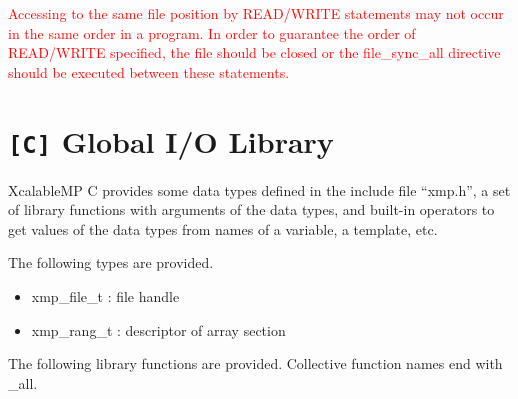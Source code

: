    \textcolor{red}{
   Accessing to the same file position by READ/WRITE statements may not
   occur in the same order in a program. In order to guarantee the order
   of READ/WRITE specified, the file should be closed or the
   file\_sync\_all directive should be executed between these
   statements.
   }
   \fi
   
   \section{{\tt [C]} Global I/O Library}
   XcalableMP C provides some data types defined in the include file ``xmp.h'',
   a set of library functions with arguments of the data types, and
   built-in operators to get values of the data types from names of a
   variable, a template, etc.

   The following types are provided.

   \begin{itemize}
    \item xmp\_file\_t : file handle
    \item xmp\_rang\_t : descriptor of array section
   \end{itemize}

   The following library functions are provided.
   Collective function names end with \_all.

